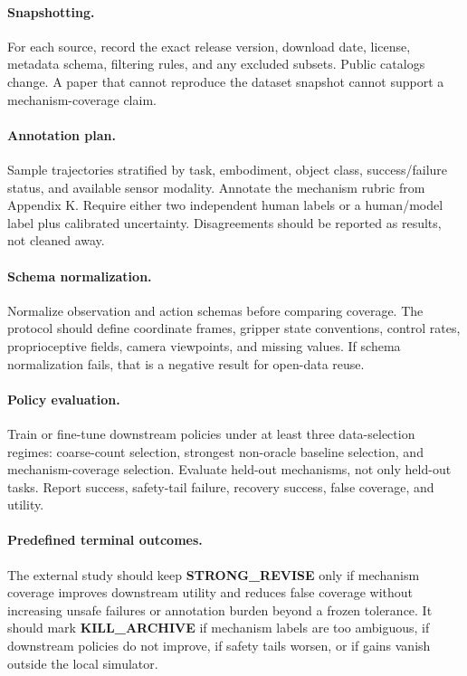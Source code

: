 \documentclass{article}
\begin{document}
\paragraph{Snapshotting.}
For each source, record the exact release version, download date, license, metadata schema, filtering rules, and any excluded subsets. Public catalogs change. A paper that cannot reproduce the dataset snapshot cannot support a mechanism-coverage claim.

\paragraph{Annotation plan.}
Sample trajectories stratified by task, embodiment, object class, success/failure status, and available sensor modality. Annotate the mechanism rubric from Appendix K. Require either two independent human labels or a human/model label plus calibrated uncertainty. Disagreements should be reported as results, not cleaned away.

\paragraph{Schema normalization.}
Normalize observation and action schemas before comparing coverage. The protocol should define coordinate frames, gripper state conventions, control rates, proprioceptive fields, camera viewpoints, and missing values. If schema normalization fails, that is a negative result for open-data reuse.

\paragraph{Policy evaluation.}
Train or fine-tune downstream policies under at least three data-selection regimes: coarse-count selection, strongest non-oracle baseline selection, and mechanism-coverage selection. Evaluate held-out mechanisms, not only held-out tasks. Report success, safety-tail failure, recovery success, false coverage, and utility.

\paragraph{Predefined terminal outcomes.}
The external study should keep \textbf{STRONG\_REVISE} only if mechanism coverage improves downstream utility and reduces false coverage without increasing unsafe failures or annotation burden beyond a frozen tolerance. It should mark \textbf{KILL\_ARCHIVE} if mechanism labels are too ambiguous, if downstream policies do not improve, if safety tails worsen, or if gains vanish outside the local simulator.
\end{document}
